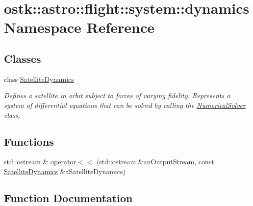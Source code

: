 \hypertarget{namespaceostk_1_1astro_1_1flight_1_1system_1_1dynamics}{}\section{ostk\+:\+:astro\+:\+:flight\+:\+:system\+:\+:dynamics Namespace Reference}
\label{namespaceostk_1_1astro_1_1flight_1_1system_1_1dynamics}
\subsection*{Classes}
\begin{DoxyCompactItemize}
\item 
class \hyperlink{classostk_1_1astro_1_1flight_1_1system_1_1dynamics_1_1_satellite_dynamics}{Satellite\+Dynamics}
\begin{DoxyCompactList}\small\item\em Defines a satellite in orbit subject to forces of varying fidelity. Represents a system of differential equations that can be solved by calling the \hyperlink{classostk_1_1astro_1_1_numerical_solver}{Numerical\+Solver} class. \end{DoxyCompactList}\end{DoxyCompactItemize}
\subsection*{Functions}
\begin{DoxyCompactItemize}
\item 
std\+::ostream \& \hyperlink{namespaceostk_1_1astro_1_1flight_1_1system_1_1dynamics_a6f5490ccec4bf39bd4de23b8c86101f0}{operator$<$$<$} (std\+::ostream \&an\+Output\+Stream, const \hyperlink{classostk_1_1astro_1_1flight_1_1system_1_1dynamics_1_1_satellite_dynamics}{Satellite\+Dynamics} \&a\+Satellite\+Dynamics)
\end{DoxyCompactItemize}


\subsection{Function Documentation}
\mbox{\label{namespaceostk_1_1astro_1_1flight_1_1system_1_1dynamics_a6f5490ccec4bf39bd4de23b8c86101f0}} 
